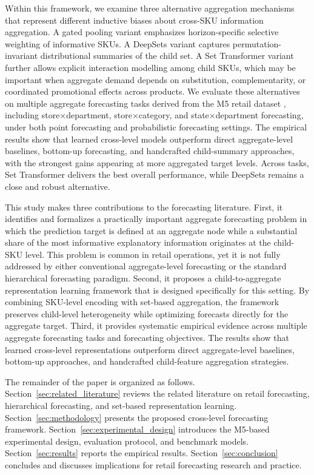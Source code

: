 \documentclass[12pt]{article}
\begin{document}
Within this framework, we examine three alternative aggregation mechanisms that represent different inductive biases about cross-SKU information aggregation. A gated pooling variant emphasizes horizon-specific selective weighting of informative SKUs. A DeepSets variant captures permutation-invariant distributional summaries of the child set. A Set Transformer variant further allows explicit interaction modelling among child SKUs, which may be important when aggregate demand depends on substitution, complementarity, or coordinated promotional effects across products. We evaluate these alternatives on multiple aggregate forecasting tasks derived from the M5 retail dataset \textcite{makridakis2022m5bg}, including store×department, store×category, and state×department forecasting, under both point forecasting and probabilistic forecasting settings. The empirical results show that learned cross-level models outperform direct aggregate-level baselines, bottom-up forecasting, and handcrafted child-summary approaches, with the strongest gains appearing at more aggregated target levels. Across tasks, Set Transformer delivers the best overall performance, while DeepSets remains a close and robust alternative.

This study makes three contributions to the forecasting literature. First, it identifies and formalizes a practically important aggregate forecasting problem in which the prediction target is defined at an aggregate node while a substantial share of the most informative explanatory information originates at the child-SKU level. This problem is common in retail operations, yet it is not fully addressed by either conventional aggregate-level forecasting or the standard hierarchical forecasting paradigm. Second, it proposes a child-to-aggregate representation learning framework that is designed specifically for this setting. By combining SKU-level encoding with set-based aggregation, the framework preserves child-level heterogeneity while optimizing forecasts directly for the aggregate target. Third, it provides systematic empirical evidence across multiple aggregate forecasting tasks and forecasting objectives. The results show that learned cross-level representations outperform direct aggregate-level baselines, bottom-up approaches, and handcrafted child-feature aggregation strategies. 

The remainder of the paper is organized as follows. Section~\ref{sec:related_literature} reviews the related literature on retail forecasting, hierarchical forecasting, and set-based representation learning. Section~\ref{sec:methodology} presents the proposed cross-level forecasting framework. Section~\ref{sec:experimental_design} introduces the M5-based experimental design, evaluation protocol, and benchmark models. Section~\ref{sec:results} reports the empirical results. Section~\ref{sec:conclusion} concludes and discusses implications for retail forecasting research and practice.
\end{document}

